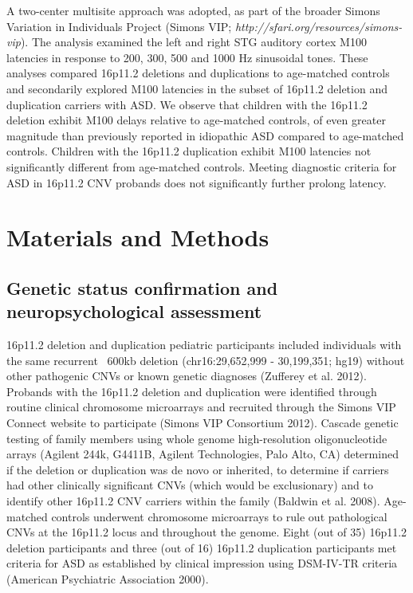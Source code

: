 \documentclass{article}
\begin{document}
A two-center multisite approach was adopted, as part of the broader Simons Variation in Individuals Project (Simons VIP; \emph{http://sfari.org/resources/simons-vip}). The analysis examined the left and right STG auditory cortex M100 latencies in response to 200, 300, 500 and 1000 Hz sinusoidal tones. These analyses compared 16p11.2 deletions and duplications to age-matched controls and secondarily explored M100 latencies in the subset of 16p11.2 deletion and duplication carriers with ASD.  We observe that children with the 16p11.2 deletion exhibit M100 delays relative to age-matched controls, of even greater magnitude than previously reported in idiopathic ASD compared to age-matched controls. Children with the 16p11.2 duplication exhibit M100 latencies not significantly different from age-matched controls. Meeting diagnostic criteria for ASD in 16p11.2 CNV probands does not significantly further prolong latency.  

\medskip

\section*{Materials and Methods}

\subsection*{Genetic status confirmation and neuropsychological assessment}

16p11.2 deletion and duplication pediatric participants included individuals with the same recurrent ~600kb deletion (chr16:29,652,999 - 30,199,351; hg19) without other pathogenic CNVs or known genetic diagnoses (Zufferey et al. 2012).  Probands with the 16p11.2 deletion and duplication were identified through routine clinical chromosome microarrays and recruited through the Simons VIP Connect website to participate (Simons VIP Consortium 2012).  Cascade genetic testing of family members using whole genome high-resolution oligonucleotide arrays (Agilent 244k, G4411B, Agilent Technologies, Palo Alto, CA) determined if the deletion or duplication was de novo or inherited, to determine if carriers had other clinically significant CNVs (which would be exclusionary) and to identify other 16p11.2 CNV carriers within the family (Baldwin et al. 2008). Age-matched controls underwent chromosome microarrays to rule out pathological CNVs at the 16p11.2 locus and throughout the genome. Eight (out of 35) 16p11.2 deletion participants and three (out of 16) 16p11.2 duplication participants met criteria for ASD as established by clinical impression using DSM-IV-TR criteria (American Psychiatric Association 2000).   
\end{document}
